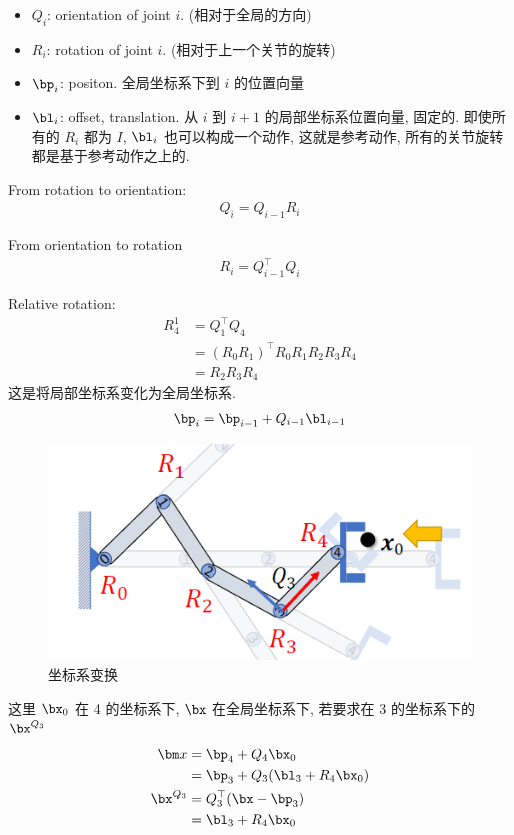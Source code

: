 \begin{itemize}
    \item $Q_i$: orientation of joint $i$.  (相对于全局的方向)
    \item $R_i$: rotation of joint $i$. (相对于上一个关节的旋转)
    \item $\bp_i$: positon. 全局坐标系下到 $i$ 的位置向量
    \item $\bl_i$: offset, translation. 从 $i$ 到 $i+1$ 的局部坐标系位置向量, 固定的. 即使所有的 $R_i$ 都为 $I$, $\bl_i$ 也可以构成一个动作, 这就是参考动作, 所有的关节旋转都是基于参考动作之上的. 
\end{itemize}

From rotation to orientation:
\begin{align*}
    Q_i=Q_{i-1}R_i
\end{align*}

From orientation to rotation
\begin{align*}
    R_i=Q_{i-1}^\top Q_i
\end{align*}

Relative rotation:
\begin{align*}
    R_4^1&=Q_1^\top Q_4\\
    &= (R_0R_1)^\top R_0 R_1 R_2R_3R_4\\
    &=R_2R_3R_4
\end{align*}
这是将局部坐标系变化为全局坐标系.
\begin{align*}
    \bp_i=\bp_{i-1}+Q_{i-1}\bl_{i-1}
\end{align*}

\begin{figure}[!htb]
    \centering
    \includegraphics[width=0.618\linewidth]{pic/1053/反向求解}
    \caption{坐标系变换}
\end{figure}
这里 $\bx_0$ 在 4 的坐标系下, $\bx$ 在全局坐标系下, 若要求在 3 的坐标系下的 $\bx^{Q_3}$
\begin{align*}
    \bm x&=\bp_4+Q_4\bx_0\\
    &=\bp_3+Q_3(\bl_3+R_4\bx_0)\\
    \bx^{Q_3}&=Q_3^\top(\bx-\bp_3)\\
    &=\bl_3+R_4\bx_0
\end{align*}


